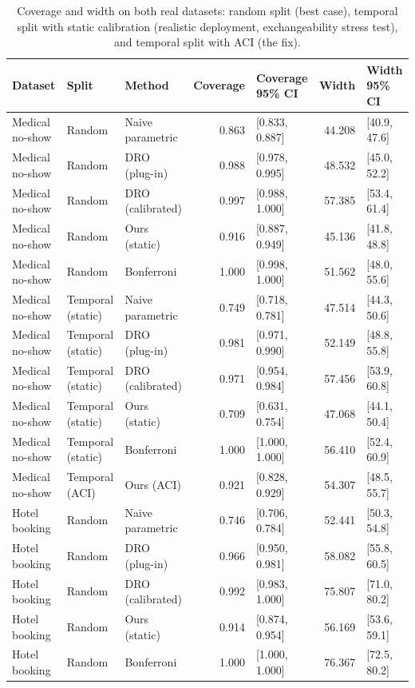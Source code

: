 \begin{table}[htbp]
\centering
\caption{Coverage and width on both real datasets: random split (best case), temporal split with static calibration (realistic deployment, exchangeability stress test), and temporal split with ACI (the fix).}
\label{tab:real-data-comparison}
\begin{tabular}{lllrlrl}
\toprule
Dataset & Split & Method & Coverage & Coverage 95\% CI & Width & Width 95\% CI \\
\midrule
Medical no-show & Random & Naive parametric & 0.863 & [0.833, 0.887] & 44.208 & [40.9, 47.6] \\
Medical no-show & Random & DRO (plug-in) & 0.988 & [0.978, 0.995] & 48.532 & [45.0, 52.2] \\
Medical no-show & Random & DRO (calibrated) & 0.997 & [0.988, 1.000] & 57.385 & [53.4, 61.4] \\
Medical no-show & Random & Ours (static) & 0.916 & [0.887, 0.949] & 45.136 & [41.8, 48.8] \\
Medical no-show & Random & Bonferroni & 1.000 & [0.998, 1.000] & 51.562 & [48.0, 55.6] \\
Medical no-show & Temporal (static) & Naive parametric & 0.749 & [0.718, 0.781] & 47.514 & [44.3, 50.6] \\
Medical no-show & Temporal (static) & DRO (plug-in) & 0.981 & [0.971, 0.990] & 52.149 & [48.8, 55.8] \\
Medical no-show & Temporal (static) & DRO (calibrated) & 0.971 & [0.954, 0.984] & 57.456 & [53.9, 60.8] \\
Medical no-show & Temporal (static) & Ours (static) & 0.709 & [0.631, 0.754] & 47.068 & [44.1, 50.4] \\
Medical no-show & Temporal (static) & Bonferroni & 1.000 & [1.000, 1.000] & 56.410 & [52.4, 60.9] \\
Medical no-show & Temporal (ACI) & Ours (ACI) & 0.921 & [0.828, 0.929] & 54.307 & [48.5, 55.7] \\
Hotel booking & Random & Naive parametric & 0.746 & [0.706, 0.784] & 52.441 & [50.3, 54.8] \\
Hotel booking & Random & DRO (plug-in) & 0.966 & [0.950, 0.981] & 58.082 & [55.8, 60.5] \\
Hotel booking & Random & DRO (calibrated) & 0.992 & [0.983, 1.000] & 75.807 & [71.0, 80.2] \\
Hotel booking & Random & Ours (static) & 0.914 & [0.874, 0.954] & 56.169 & [53.6, 59.1] \\
Hotel booking & Random & Bonferroni & 1.000 & [1.000, 1.000] & 76.367 & [72.5, 80.2] \\

\end{tabular}
\end{table}
